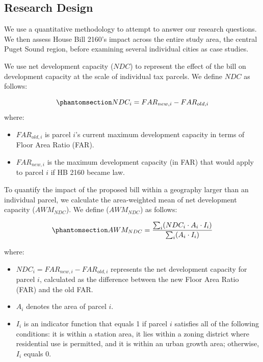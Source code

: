 \documentclass[
]{agujournal2019}
\providecommand{\tightlist}{%
  \setlength{\itemsep}{0pt}\setlength{\parskip}{0pt}}\usepackage{longtable,booktabs,array}
\begin{document}
\subsection{Research Design}\label{research-design}

We use a quantitative methodology to attempt to answer our research
questions. We then assess House Bill 2160's impact across the entire
study area, the central Puget Sound region, before examining several
individual cities as case studies.

We use net development capacity (\({NDC}\)) to represent the effect of
the bill on development capacity at the scale of individual tax parcels.
We define \({NDC}\) as follows:

\begin{equation}\phantomsection\label{eq-ndc}{
NDC_i = FAR_{new,i} - FAR_{old,i}
}\end{equation} where:

\begin{itemize}
\tightlist
\item
  \(FAR_{old,i}\) is parcel \(i\)'s current maximum development capacity
  in terms of Floor Area Ratio (FAR).
\item
  \(FAR_{new,i}\) is the maximum development capacity (in FAR) that
  would apply to parcel \(i\) if HB 2160 became law.
\end{itemize}

To quantify the impact of the proposed bill within a geography larger
than an individual parcel, we calculate the area-weighted mean of net
development capacity (\(AWM_{NDC}\)). We define (\(AWM_{NDC}\)) as
follows:

\begin{equation}\phantomsection\label{eq-awm-ndc}{
AWM_{NDC} = \frac{\sum_{i}(NDC_i \cdot A_i \cdot I_i)}{\sum_{i}(A_i \cdot I_i)}
}\end{equation}

where:

\begin{itemize}
\tightlist
\item
  \(NDC_i = FAR_{new,i} - FAR_{old,i}\) represents the net development
  capacity for parcel \(i\), calculated as the difference between the
  new Floor Area Ratio (FAR) and the old FAR.
\item
  \(A_i\) denotes the area of parcel \(i\).
\item
  \(I_i\) is an indicator function that equals 1 if parcel \(i\)
  satisfies all of the following conditions: it is within a station
  area, it lies within a zoning district where residential use is
  permitted, and it is within an urban growth area; otherwise, \(I_i\)
  equals 0.
\end{itemize}
\end{document}
